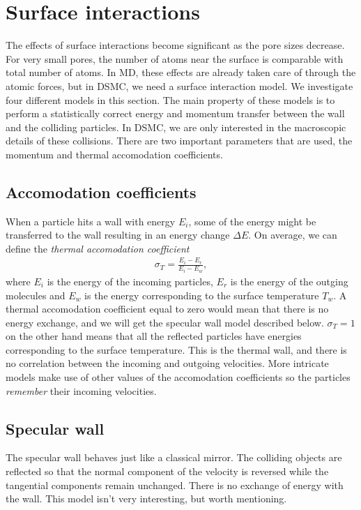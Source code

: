 \section{Surface interactions}
\label{sec:surface_interactions}
The effects of surface interactions become significant as the pore sizes decrease. For very small pores, the number of atoms near the surface is comparable with total number of atoms. In MD, these effects are already taken care of through the atomic forces, but in DSMC, we need a surface interaction model. We investigate four different models in this section. The main property of these models is to perform a statistically correct energy and momentum transfer between the wall and the colliding particles. In DSMC, we are only interested in the macroscopic details of these collisions. There are two important parameters that are used, the momentum and thermal accomodation coefficients.
\subsection{Accomodation coefficients}
When a particle hits a wall with energy $E_i$, some of the energy might be transferred to the wall resulting in an energy change $\Delta E$. On average, we can define the \textit{thermal accomodation coefficient} 
\begin{align}
	\sigma_T = \frac{E_i - E_r}{E_i - E_w},
\end{align}
where $E_i$ is the energy of the incoming particles, $E_r$ is the energy of the outging molecules and $E_w$ is the energy corresponding to the surface temperature $T_w$. A thermal accomodation coefficient equal to zero would mean that there is no energy exchange, and we will get the specular wall model described below. $\sigma_T=1$ on the other hand means that all the reflected particles have energies corresponding to the surface temperature. This is the thermal wall, and there is no correlation between the incoming and outgoing velocities. More intricate models make use of other values of the accomodation coefficients so the particles \textit{remember} their incoming velocities.

\subsection{Specular wall}
The specular wall behaves just like a classical mirror. The colliding objects are reflected so that the normal component of the velocity is reversed while the tangential components remain unchanged. There is no exchange of energy with the wall. This model isn't very interesting, but worth mentioning.


